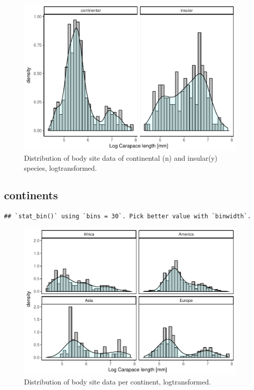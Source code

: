 \documentclass[]{article}
\begin{document}
\begin{figure}[htbp]
\centering
\includegraphics{MA_JJ_files/figure-latex/HistCI-1.pdf}
\caption{Distribution of body site data of continental (n) and
insular(y) species, logtransformed.}
\end{figure}

\newpage

\subsection{continents}\label{continents}

\begin{verbatim}
## `stat_bin()` using `bins = 30`. Pick better value with `binwidth`.
\end{verbatim}

\begin{figure}[htbp]
\centering
\includegraphics{MA_JJ_files/figure-latex/HistCon-1.pdf}
\caption{Distribution of body site data per continent, logtransformed.}
\end{figure}
\end{document}
